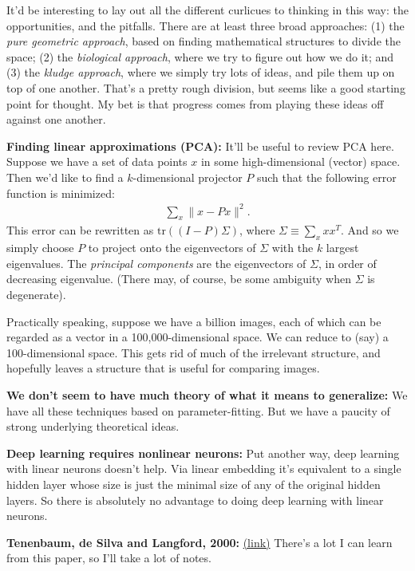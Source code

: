 \documentclass[12pt]{article}
\newcommand{\link}[2]{\href{#1}{#2}}
\begin{document}
It'd be interesting to lay out all the different curlicues to thinking
in this way: the opportunities, and the pitfalls.  There are at least
three broad approaches: (1) the \emph{pure geometric approach}, based
on finding mathematical structures to divide the space; (2) the
\emph{biological approach}, where we try to figure out how we do it;
and (3) the \emph{kludge approach}, where we simply try lots of ideas,
and pile them up on top of one another.  That's a pretty rough
division, but seems like a good starting point for thought.  My bet is
that progress comes from playing these ideas off against one another.

\textbf{Finding linear approximations (PCA):} It'll be useful to
review PCA here.  Suppose we have a set of data points $x$ in some
high-dimensional (vector) space.  Then we'd like to find a
$k$-dimensional projector $P$ such that the following error function
is minimized:
\begin{eqnarray}
\sum_x \| x-Px \|^2.
\end{eqnarray}
This error can be rewritten as $\mbox{tr}((I-P)\Sigma)$, where $\Sigma
\equiv \sum_x x x^T$.  And so we simply choose $P$ to project onto the
eigenvectors of $\Sigma$ with the $k$ largest eigenvalues.  The
\emph{principal components} are the eigenvectors of $\Sigma$, in order
of decreasing eigenvalue.  (There may, of course, be some ambiguity
when $\Sigma$ is degenerate).

Practically speaking, suppose we have a billion images, each of which
can be regarded as a vector in a 100,000-dimensional space.  We can
reduce to (say) a 100-dimensional space.  This gets rid of much of the
irrelevant structure, and hopefully leaves a structure that is useful
for comparing images.

\textbf{We don't seem to have much theory of what it means to
  generalize:} We have all these techniques based on
parameter-fitting.  But we have a paucity of strong underlying
theoretical ideas.

\textbf{Deep learning requires nonlinear neurons:} Put another way,
deep learning with linear neurons doesn't help.  Via linear embedding
it's equivalent to a single hidden layer whose size is just the
minimal size of any of the original hidden layers.  So there is
absolutely no advantage to doing deep learning with linear neurons.

\textbf{Tenenbaum, de Silva and Langford, 2000:}
\link{http://scholar.google.ca/scholar?cluster=14602426245887619907&hl=en&as_sdt=0,5}{(link)}
There's a lot I can learn from this paper, so I'll take a lot of
notes.
\end{document}
